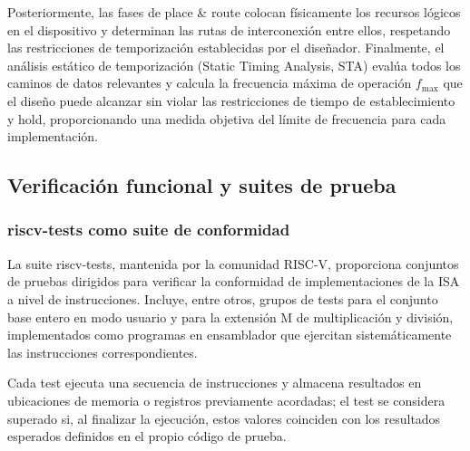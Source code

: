 Posteriormente, las fases de place \& route colocan físicamente los recursos lógicos en el dispositivo y determinan las rutas de interconexión entre ellos, respetando las restricciones de temporización establecidas por el diseñador. Finalmente, el análisis estático de temporización (Static Timing Analysis, STA) evalúa todos los caminos de datos relevantes y calcula la frecuencia máxima de operación \(f_{\text{max}}\) que el diseño puede alcanzar sin violar las restricciones de tiempo de establecimiento y hold, proporcionando una medida objetiva del límite de frecuencia para cada implementación.\parencite{IEEE2017SystemVerilog,intel2016cyclone}


\subsection{Verificación funcional y suites de prueba}

\subsubsection{riscv-tests como suite de conformidad}

La suite riscv-tests, mantenida por la comunidad RISC-V, proporciona conjuntos de pruebas dirigidos para verificar la conformidad de implementaciones de la ISA a nivel de instrucciones. Incluye, entre otros, grupos de tests para el conjunto base entero en modo usuario y para la extensión M de multiplicación y división, implementados como programas en ensamblador que ejercitan sistemáticamente las instrucciones correspondientes.\parencite{RISCVFoundation2019}

Cada test ejecuta una secuencia de instrucciones y almacena resultados en ubicaciones de memoria o registros previamente acordadas; el test se considera superado si, al finalizar la ejecución, estos valores coinciden con los resultados esperados definidos en el propio código de prueba.\parencite{lowRISC2019}